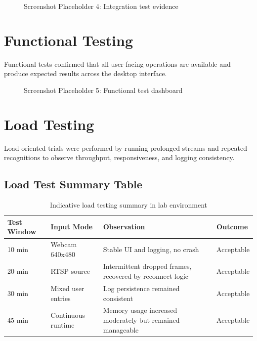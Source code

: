 \documentclass{fisatprojectfinal}
\begin{document}
\begin{figure}[h!]
	\begin{center}
		\fbox{\rule{0pt}{2.4in}\rule{0.85\linewidth}{0pt}}
		\caption{Screenshot Placeholder 4: Integration test evidence}
	\end{center}
\end{figure}

\section{Functional Testing}
Functional tests confirmed that all user-facing operations are available and produce expected results across the desktop interface.

\begin{figure}[h!]
	\begin{center}
		\fbox{\rule{0pt}{2.4in}\rule{0.85\linewidth}{0pt}}
		\caption{Screenshot Placeholder 5: Functional test dashboard}
	\end{center}
\end{figure}

\section{Load Testing}
Load-oriented trials were performed by running prolonged streams and repeated recognitions to observe throughput, responsiveness, and logging consistency.

\subsection*{Load Test Summary Table}
\begin{table}[h!]
\centering
\caption{Indicative load testing summary in lab environment}
\begin{tabular}{|l|l|l|l|}
\hline
Test Window & Input Mode & Observation & Outcome \\
\hline
10 min & Webcam 640x480 & Stable UI and logging, no crash & Acceptable \\
\hline
20 min & RTSP source & Intermittent dropped frames, recovered by reconnect logic & Acceptable \\
\hline
30 min & Mixed user entries & Log persistence remained consistent & Acceptable \\
\hline
45 min & Continuous runtime & Memory usage increased moderately but remained manageable & Acceptable \\
\hline
\end{tabular}
\end{table}
\end{document}
